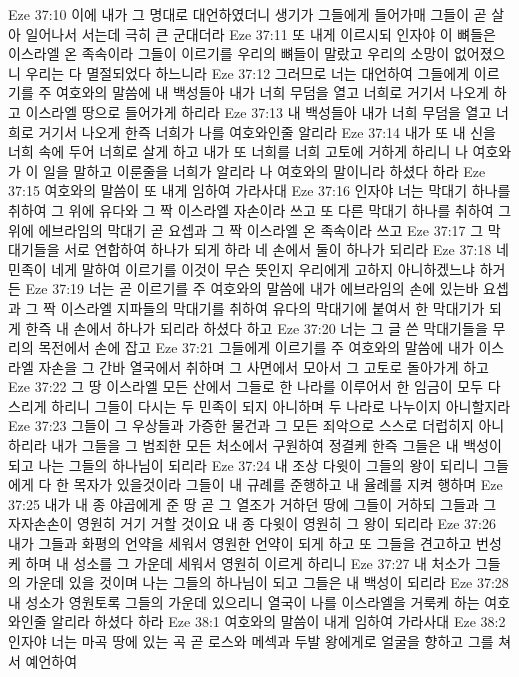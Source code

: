 Eze 37:10  이에 내가 그 명대로 대언하였더니 생기가 그들에게 들어가매 그들이 곧 살아 일어나서 서는데 극히 큰 군대더라
Eze 37:11  또 내게 이르시되 인자야 이 뼈들은 이스라엘 온 족속이라 그들이 이르기를 우리의 뼈들이 말랐고 우리의 소망이 없어졌으니 우리는 다 멸절되었다 하느니라
Eze 37:12  그러므로 너는 대언하여 그들에게 이르기를 주 여호와의 말씀에 내 백성들아 내가 너희 무덤을 열고 너희로 거기서 나오게 하고 이스라엘 땅으로 들어가게 하리라
Eze 37:13  내 백성들아 내가 너희 무덤을 열고 너희로 거기서 나오게 한즉 너희가 나를 여호와인줄 알리라
Eze 37:14  내가 또 내 신을 너희 속에 두어 너희로 살게 하고 내가 또 너희를 너희 고토에 거하게 하리니 나 여호와가 이 일을 말하고 이룬줄을 너희가 알리라 나 여호와의 말이니라 하셨다 하라
Eze 37:15  여호와의 말씀이 또 내게 임하여 가라사대
Eze 37:16  인자야 너는 막대기 하나를 취하여 그 위에 유다와 그 짝 이스라엘 자손이라 쓰고 또 다른 막대기 하나를 취하여 그 위에 에브라임의 막대기 곧 요셉과 그 짝 이스라엘 온 족속이라 쓰고
Eze 37:17  그 막대기들을 서로 연합하여 하나가 되게 하라 네 손에서 둘이 하나가 되리라
Eze 37:18  네 민족이 네게 말하여 이르기를 이것이 무슨 뜻인지 우리에게 고하지 아니하겠느냐 하거든
Eze 37:19  너는 곧 이르기를 주 여호와의 말씀에 내가 에브라임의 손에 있는바 요셉과 그 짝 이스라엘 지파들의 막대기를 취하여 유다의 막대기에 붙여서 한 막대기가 되게 한즉 내 손에서 하나가 되리라 하셨다 하고
Eze 37:20  너는 그 글 쓴 막대기들을 무리의 목전에서 손에 잡고
Eze 37:21  그들에게 이르기를 주 여호와의 말씀에 내가 이스라엘 자손을 그 간바 열국에서 취하며 그 사면에서 모아서 그 고토로 돌아가게 하고
Eze 37:22  그 땅 이스라엘 모든 산에서 그들로 한 나라를 이루어서 한 임금이 모두 다스리게 하리니 그들이 다시는 두 민족이 되지 아니하며 두 나라로 나누이지 아니할지라
Eze 37:23  그들이 그 우상들과 가증한 물건과 그 모든 죄악으로 스스로 더럽히지 아니하리라 내가 그들을 그 범죄한 모든 처소에서 구원하여 정결케 한즉 그들은 내 백성이 되고 나는 그들의 하나님이 되리라
Eze 37:24  내 조상 다윗이 그들의 왕이 되리니 그들에게 다 한 목자가 있을것이라 그들이 내 규례를 준행하고 내 율례를 지켜 행하며
Eze 37:25  내가 내 종 야곱에게 준 땅 곧 그 열조가 거하던 땅에 그들이 거하되 그들과 그 자자손손이 영원히 거기 거할 것이요 내 종 다윗이 영원히 그 왕이 되리라
Eze 37:26  내가 그들과 화평의 언약을 세워서 영원한 언약이 되게 하고 또 그들을 견고하고 번성케 하며 내 성소를 그 가운데 세워서 영원히 이르게 하리니
Eze 37:27  내 처소가 그들의 가운데 있을 것이며 나는 그들의 하나님이 되고 그들은 내 백성이 되리라
Eze 37:28  내 성소가 영원토록 그들의 가운데 있으리니 열국이 나를 이스라엘을 거룩케 하는 여호와인줄 알리라 하셨다 하라
Eze 38:1  여호와의 말씀이 내게 임하여 가라사대
Eze 38:2  인자야 너는 마곡 땅에 있는 곡 곧 로스와 메섹과 두발 왕에게로 얼굴을 향하고 그를 쳐서 예언하여
